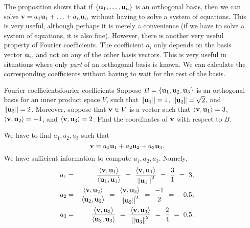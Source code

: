 The proposition shows that if $\set{\vect{u}_1,\ldots,\vect{u}_n}$ is
an orthogonal basis, then we can solve
$\vect{v} = a_1\vect{u}_1 + \ldots + a_n\vect{u}_n$ without having to
solve a system of equations. This is very useful, although perhaps it
is merely a convenience (if we have to solve a system of equations, it
is also fine). However, there is another very useful property of
Fourier coefficients. The coefficient $a_i$ only depends on the basis
vector $\vect{u}_i$, and not on any of the other basis vectors. This
is very useful in situations where only {\em part} of an orthogonal
basis is known. We can calculate the corresponding coefficients
without having to wait for the rest of the basis.

\begin{example}{Fourier coefficients}{fourier-coefficients}
  Suppose $B=\set{\vect{u}_1,\vect{u}_2,\vect{u}_3}$ is an orthogonal
  basis for an inner product space $V$, such that
  $\norm{\vect{u}_1}=1$, $\norm{\vect{u}_2}=\sqrt{2}$, and
  $\norm{\vect{u}_3}=2$.  Moreover, suppose that $\vect{v}\in V$ is a
  vector such that $\iprod{\vect{v},\vect{u}_1} = 3$,
  $\iprod{\vect{v},\vect{u}_2} = -1$, and
  $\iprod{\vect{v},\vect{u}_3} = 2$.  Find the coordinates of
  $\vect{v}$ with respect to $B$.
\end{example}

\begin{solution}
  We have to find $a_1,a_2,a_3$ such that
  \begin{equation*}
    \vect{v} = a_1\vect{u}_1 + a_2\vect{u}_2 + a_3\vect{u}_3.
  \end{equation*}
  We have sufficient information to compute $a_1,a_2,a_3$. Namely,
  \begin{eqnarray*}
    a_1
    &=& \frac{\iprod{\vect{v},\vect{u}_1}}{\iprod{\vect{u}_1,\vect{u}_1}}
        ~=~ \frac{\iprod{\vect{v},\vect{u}_1}}{\norm{\vect{u}_1}^2}
        ~=~ \frac{3}{1} ~=~ 3, \\
    a_2
    &=& \frac{\iprod{\vect{v},\vect{u}_2}}{\iprod{\vect{u}_2,\vect{u}_2}}
        ~=~ \frac{\iprod{\vect{v},\vect{u}_2}}{\norm{\vect{u}_2}^2}
        ~=~ \frac{-1}{2} ~=~ -0.5, \\
    a_3
    &=& \frac{\iprod{\vect{v},\vect{u}_3}}{\iprod{\vect{u}_3,\vect{u}_3}}
        ~=~ \frac{\iprod{\vect{v},\vect{u}_3}}{\norm{\vect{u}_3}^2}
        ~=~ \frac{2}{4} ~=~ 0.5.
  \end{eqnarray*}
\end{solution}
